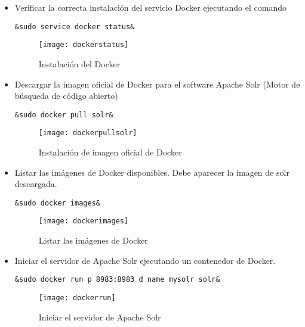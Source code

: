\documentclass[10pt]{article}   			%
\begin{document}
\begin{itemize}
		
\item Verificar la correcta instalación del servicio Docker ejecutando el comando
\begin{small}
\begin{lstlisting}[frame=single,style=base]	
	&sudo service docker status&
\end{lstlisting}
\end{small}
\begin{figure}[ht] 
	\centering
		\texttt{[image: dockerstatus]}   
	\caption{Instalación del Docker} \label{fig:dockerstatus}
\end{figure}

\item Descargar la imagen oficial de Docker para el software Apache Solr (Motor de búsqueda de código abierto)
\begin{small}
\begin{lstlisting}[frame=single,style=base]	
	&sudo docker pull solr&
\end{lstlisting}
\end{small}
\begin{figure}[ht] 
	\centering
		\texttt{[image: dockerpullsolr]}   
	\caption{Instalación de imagen oficial de Docker} \label{fig:dockerpullsolr}
\end{figure}

\item Listar las imágenes de Docker disponibles. Debe aparecer la imagen de solr descargada.
\begin{small}
\begin{lstlisting}[frame=single,style=base]	
	&sudo docker images&
\end{lstlisting}
\end{small}
\begin{figure}[ht] 
	\centering
		\texttt{[image: dockerimages]}   
	\caption{Listar las imágenes de Docker} \label{fig:dockerimages}
\end{figure}

\item Iniciar el servidor de Apache Solr ejecutando un contenedor de Docker.
\begin{small}
\begin{lstlisting}[frame=single,style=base]	
	&sudo docker run p 8983:8983 d name mysolr solr&
\end{lstlisting}
\end{small}
\begin{figure}[ht] 
	\centering
		\texttt{[image: dockerrun]}   
	\caption{Iniciar el servidor de Apache Solr} \label{fig:dockerrun}
\end{figure}


\end{itemize}
\end{document}
